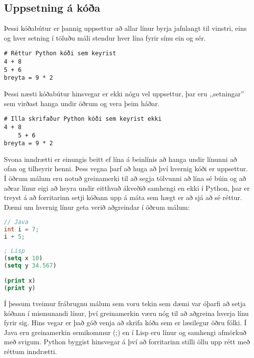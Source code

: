 \documentclass[11pt,fleqn]{book} %
\begin{document}
\subsection{Uppsetning á kóða}
Þessi kóðabútur er þannig uppsettur að allar línur byrja jafnlangt til vinstri, eins og hver setning í töluðu máli stendur hver lína fyrir sínu ein og sér.
\begin{lstlisting}[caption=Réttur Python kóði]
# Réttur Python kóði sem keyrist
4 + 8
5 + 6
breyta = 9 * 2
\end{lstlisting}

Þessi næsti kóðabútur hinsvegar er ekki nógu vel uppsettur, þar eru ,,setningar'' sem virðast hanga undir öðrum og vera þeim háðar. 

\begin{lstlisting}[caption=Rangur Python kóði]
# Illa skrifaður Python kóði sem keyrist ekki
4 + 8
	5 + 6
breyta = 9 * 2
\end{lstlisting}

Svona inndrætti er einungis beitt ef lína á beinlínis að hanga undir línunni að ofan og tilheyrir henni. 
Þess vegna þarf að huga að því hvernig kóði er uppsettur. 
Í öðrum málum eru notuð greinamerki til að segja tölvunni að lína sé búin og að aðrar línur eigi að heyra undir eitthvað ákveðið samhengi en ekki í Python, þar er treyst á að forritarinn setji kóðann upp á máta sem hægt er að sjá að sé réttur. 
Dæmi um hvernig línur geta verið aðgreindar í öðrum málum:

\begin{lstlisting}[language=Java , caption=Dæmi um annað mál sem er strangt tagað og með greinamerkjum]
// Java
int i = 7;
i + 5;
\end{lstlisting}

\begin{lstlisting}[language=Lisp, caption=Dæmi um annað mál sem byggir á afmörkuðu samhengi en með greinamerkjum]
; Lisp
(setq x 10)
(setq y 34.567)

(print x)
(print y)
\end{lstlisting}

Í þessum tveimur frábrugnu málum sem voru tekin sem dæmi var óþarfi að setja kóðann í mismunandi línur, því greinamerkin væru nóg til að aðgreina hverja línu fyrir sig. 
Hins vegar er það góð venja að skrifa kóða sem er læsilegur öðru fólki. Í Java eru greinamerkin semikommur (;) en í Lisp eru línur og samhengi afmörkuð með svigum. 
Python byggist hinsvegar á því að forritarinn stilli öllu upp rétt með réttum inndrætti. 
\end{document}
